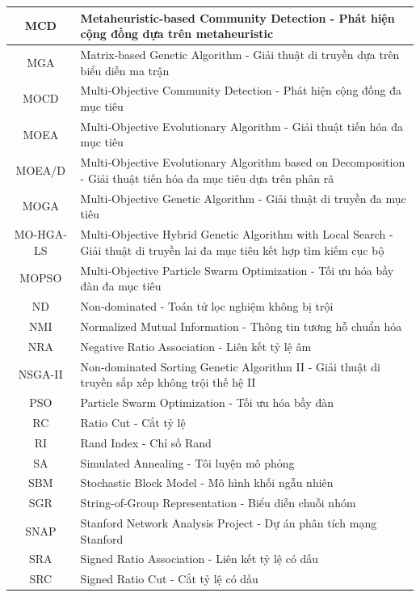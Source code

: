 \documentclass[14pt,a4paper]{extarticle}
\begin{document}
\begin{longtable}{|c|p{}|}
    MCD & Metaheuristic-based Community Detection - Phát hiện cộng đồng dựa trên metaheuristic \\ \hline
    MGA & Matrix-based Genetic Algorithm - Giải thuật di truyền dựa trên biểu diễn ma trận \\ \hline
    MOCD & Multi-Objective Community Detection - Phát hiện cộng đồng đa mục tiêu \\ \hline
    MOEA & Multi-Objective Evolutionary Algorithm - Giải thuật tiến hóa đa mục tiêu \\ \hline
    MOEA/D & Multi-Objective Evolutionary Algorithm based on Decomposition - Giải thuật tiến hóa đa mục tiêu dựa trên phân rã \\ \hline
    MOGA & Multi-Objective Genetic Algorithm - Giải thuật di truyền đa mục tiêu \\ \hline
    MO-HGA-LS & Multi-Objective Hybrid Genetic Algorithm with Local Search - Giải thuật di truyền lai đa mục tiêu kết hợp tìm kiếm cục bộ \\ \hline
    MOPSO & Multi-Objective Particle Swarm Optimization - Tối ưu hóa bầy đàn đa mục tiêu \\ \hline
    ND & Non-dominated - Toán tử lọc nghiệm không bị trội \\ \hline
    NMI & Normalized Mutual Information - Thông tin tương hỗ chuẩn hóa \\ \hline
    NRA & Negative Ratio Association - Liên kết tỷ lệ âm \\ \hline
    NSGA-II & Non-dominated Sorting Genetic Algorithm II - Giải thuật di truyền sắp xếp không trội thế hệ II \\ \hline
    PSO & Particle Swarm Optimization - Tối ưu hóa bầy đàn \\ \hline
    RC & Ratio Cut - Cắt tỷ lệ \\ \hline
    RI & Rand Index - Chỉ số Rand \\ \hline
    SA & Simulated Annealing - Tôi luyện mô phỏng \\ \hline
    SBM & Stochastic Block Model - Mô hình khối ngẫu nhiên \\ \hline
    SGR & String-of-Group Representation - Biểu diễn chuỗi nhóm \\ \hline
    SNAP & Stanford Network Analysis Project - Dự án phân tích mạng Stanford \\ \hline
    SRA & Signed Ratio Association - Liên kết tỷ lệ có dấu \\ \hline
    SRC & Signed Ratio Cut - Cắt tỷ lệ có dấu \\ \hline
\end{longtable}
\end{document}
